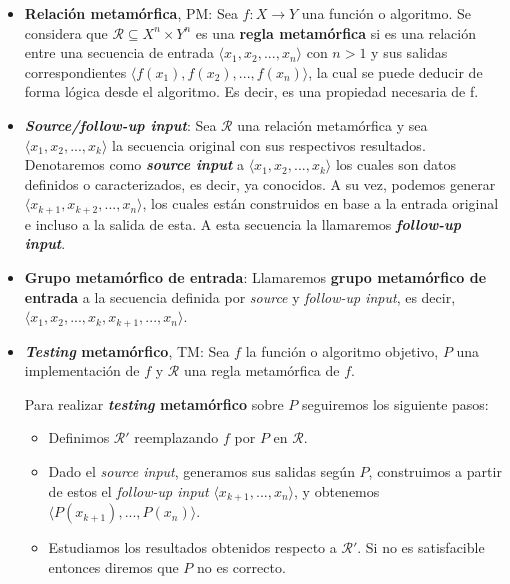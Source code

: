 \begin{itemize}
    \item \textbf{Relación metamórfica}, PM: Sea $f: X \rightarrow Y$ una función o algoritmo. Se considera que $\mathscr{R} \subseteq X^{n} \times Y^{n}$ es una \textbf{regla metamórfica} si es una relación entre una secuencia de entrada $\langle x_{1},x_{2},...,x_{n}\rangle$ con $n>1$ y sus salidas correspondientes $\langle f(x_{1}),f(x_{2}),...,f(x_{n})\rangle$, la cual se puede deducir de forma lógica desde el algoritmo. Es decir, es una propiedad necesaria de f.
    \item \textbf{\textit{Source/follow-up input}}: Sea $\mathscr{R}$ una relación metamórfica y sea $\langle x_{1},x_{2},...,x_{k}\rangle$ la secuencia original con sus respectivos resultados. Denotaremos como \textbf{\textit{source input}} a   $\langle x_{1},x_{2},...,x_{k}\rangle$  los cuales son datos definidos o caracterizados, es decir, ya conocidos. A su vez, podemos generar $\langle x_{k+1},x_{k+2},...,x_{n}\rangle$, los cuales están construidos en base a la entrada original e incluso a la salida de esta. A esta secuencia la llamaremos \textbf{\textit{follow-up input}}.
    \item \textbf{Grupo metamórfico de entrada}: Llamaremos \textbf{grupo metamórfico de entrada} a la secuencia definida por \textit{source} y \textit{follow-up input}, es decir, $\langle x_{1},x_{2},...,x_{k},x_{k+1},...,x_{n}\rangle$.
    \item \textbf{\textit{Testing} metamórfico}, TM: Sea $f$ la función o algoritmo objetivo, $P$ una implementación de $f$ y $\mathscr{R}$ una regla metamórfica de $f$.
    
    Para realizar \textbf{\textit{testing} metamórfico} sobre $P$ seguiremos los siguiente pasos:
    \begin{itemize}
        \item Definimos $\mathscr{R}'$ reemplazando $f$ por $P$ en $\mathscr{R}$.
        \item Dado el \textit{source input}, generamos sus salidas según $P$, construimos a partir de estos el \textit{follow-up input} $\langle x_{k+1},...,x_{n}\rangle$, y obtenemos $\langle P(x_{k+1}),...,P(x_{n})\rangle$.
        \item Estudiamos los resultados obtenidos respecto a $\mathscr{R}'$. Si no es satisfacible entonces diremos que $P$ no es correcto.
    \end{itemize}
\end{itemize}

